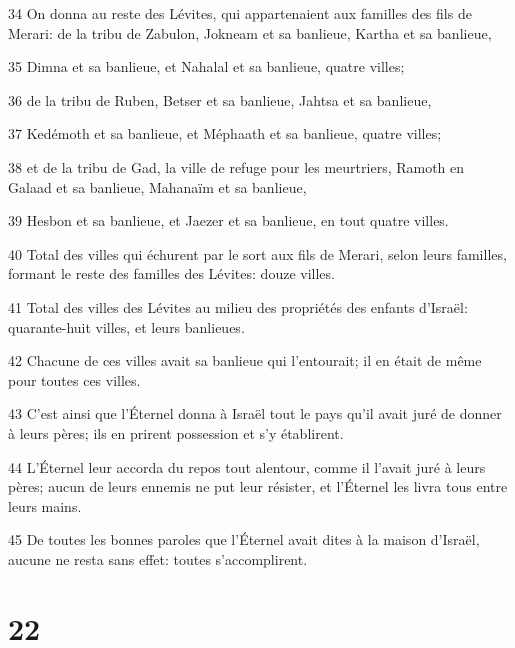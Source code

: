 \par 34 On donna au reste des Lévites, qui appartenaient aux familles des fils de Merari: de la tribu de Zabulon, Jokneam et sa banlieue, Kartha et sa banlieue,
\par 35 Dimna et sa banlieue, et Nahalal et sa banlieue, quatre villes;
\par 36 de la tribu de Ruben, Betser et sa banlieue, Jahtsa et sa banlieue,
\par 37 Kedémoth et sa banlieue, et Méphaath et sa banlieue, quatre villes;
\par 38 et de la tribu de Gad, la ville de refuge pour les meurtriers, Ramoth en Galaad et sa banlieue, Mahanaïm et sa banlieue,
\par 39 Hesbon et sa banlieue, et Jaezer et sa banlieue, en tout quatre villes.
\par 40 Total des villes qui échurent par le sort aux fils de Merari, selon leurs familles, formant le reste des familles des Lévites: douze villes.
\par 41 Total des villes des Lévites au milieu des propriétés des enfants d'Israël: quarante-huit villes, et leurs banlieues.
\par 42 Chacune de ces villes avait sa banlieue qui l'entourait; il en était de même pour toutes ces villes.
\par 43 C'est ainsi que l'Éternel donna à Israël tout le pays qu'il avait juré de donner à leurs pères; ils en prirent possession et s'y établirent.
\par 44 L'Éternel leur accorda du repos tout alentour, comme il l'avait juré à leurs pères; aucun de leurs ennemis ne put leur résister, et l'Éternel les livra tous entre leurs mains.
\par 45 De toutes les bonnes paroles que l'Éternel avait dites à la maison d'Israël, aucune ne resta sans effet: toutes s'accomplirent.

\chapter{22}

